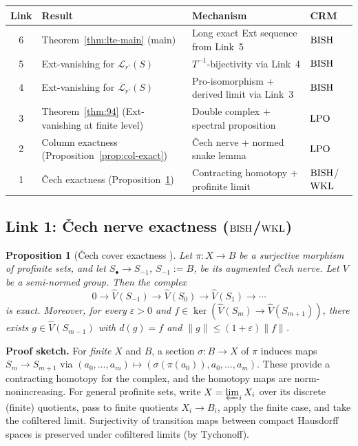 \documentclass[11pt,a4paper]{article}
\theoremstyle{plain}
\newtheorem{proposition}[theorem]{Proposition}
\theoremstyle{definition}
\newcommand{\BISH}{\textup{BISH}}
\newcommand{\WKL}{\textup{WKL}}
\newcommand{\LPO}{\textup{LPO}}
\begin{document}
\begin{center}
\small
\begin{tabular}{clll}
\toprule
\textbf{Link} & \textbf{Result} & \textbf{Mechanism} & \textbf{CRM} \\
\midrule
6 & Theorem~\ref{thm:lte-main} (main) &
  Long exact Ext sequence from Link~5 & $\BISH$ \\
5 & Ext-vanishing for $\mathcal{L}_{r'}(S)$ &
  $T^{-1}$-bijectivity via Link~4 & $\BISH$ \\
4 & Ext-vanishing for $\overline{\mathcal{L}}_{r'}(S)$ &
  Pro-isomorphism + derived limit via Link~3 & $\BISH$ \\
3 & Theorem~\ref{thm:94} (Ext-vanishing at finite level) &
  Double complex + spectral proposition & $\LPO$ \\
2 & Column exactness (Proposition~\ref{prop:col-exact}) &
  \v{C}ech nerve + normed snake lemma & $\LPO$ \\
1 & \v{C}ech exactness (Proposition~\ref{prop:cech-exact}) &
  Contracting homotopy + profinite limit & $\BISH$/$\WKL$ \\
\bottomrule
\end{tabular}
\end{center}

\subsection{Link 1: \v{C}ech nerve exactness ($\BISH$/$\WKL$)}

\begin{proposition}[\v{C}ech cover exactness {\cite{Commelin2022}}]
\label{prop:cech-exact}
Let $\pi: X \to B$ be a surjective morphism of profinite sets,
and let $S_\bullet \to S_{-1}$, $S_{-1} := B$, be its augmented
\v{C}ech nerve.  Let $V$ be a semi-normed group.  Then the complex
\[
  0 \longrightarrow \widehat{V}(S_{-1}) \longrightarrow
  \widehat{V}(S_0) \longrightarrow
  \widehat{V}(S_1) \longrightarrow \cdots
\]
is exact.  Moreover, for every $\varepsilon > 0$ and
$f \in \ker(\widehat{V}(S_m) \to \widehat{V}(S_{m+1}))$,
there exists $g \in \widehat{V}(S_{m-1})$ with $d(g) = f$
and $\|g\| \leq (1 + \varepsilon)\|f\|$.
\end{proposition}

\noindent\textbf{Proof sketch.}
For \emph{finite} $X$ and $B$, a section $\sigma: B \to X$ of $\pi$
induces maps $S_m \to S_{m+1}$ via
$(a_0, \ldots, a_m) \mapsto (\sigma(\pi(a_0)), a_0, \ldots, a_m)$.
These provide a contracting homotopy for the complex, and the homotopy
maps are norm-nonincreasing.  For general profinite sets, write
$X = \varprojlim_i X_i$ over its discrete (finite) quotients,
pass to finite quotients $X_i \to B_i$, apply the finite case, and
take the cofiltered limit.  Surjectivity of transition maps between
compact Hausdorff spaces is preserved under cofiltered limits
(by Tychonoff).
\end{document}
